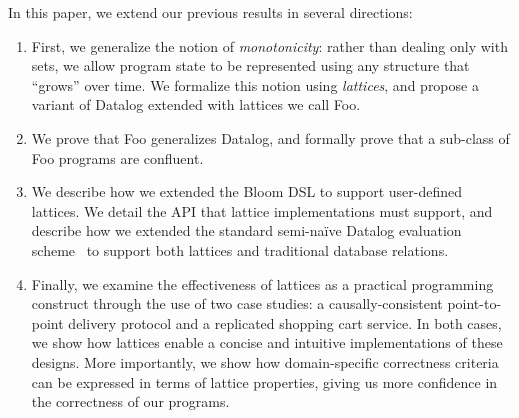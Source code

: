 In this paper, we extend our previous results in several directions:
\begin{enumerate}
\item
  First, we generalize the notion of \emph{monotonicity}: rather than dealing
  only with sets, we allow program state to be represented using any structure
  that ``grows'' over time. We formalize this notion using \emph{lattices}, and
  propose a variant of Datalog extended with lattices we call Foo.

\item
  We prove that Foo generalizes Datalog, and formally prove that a sub-class of
  Foo programs are confluent.

\item
  We describe how we extended the Bloom DSL to support user-defined lattices. We
  detail the API that lattice implementations must support, and describe how we
  extended the standard semi-na\"{i}ve Datalog evaluation scheme~\cite{semi-naive}
  to support both lattices and traditional database relations.

\item
  Finally, we examine the effectiveness of lattices as a practical programming
  construct through the use of two case studies: a causally-consistent
  point-to-point delivery protocol and a replicated shopping cart service. In
  both cases, we show how lattices enable a concise and intuitive
  implementations of these designs. More importantly, we show how
  domain-specific correctness criteria can be expressed in terms of lattice
  properties, giving us more confidence in the correctness of our programs.

\end{enumerate}
